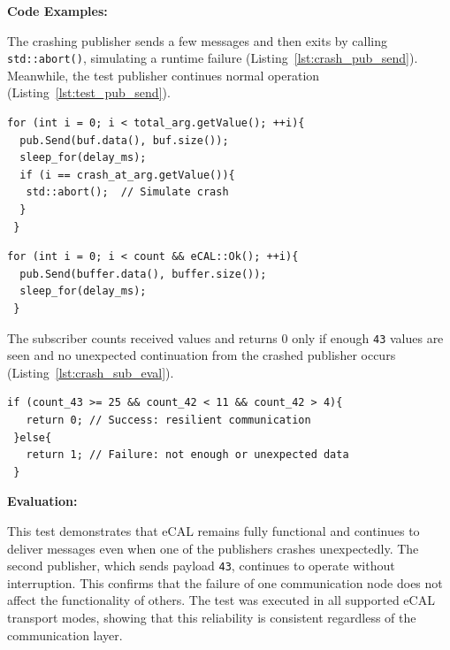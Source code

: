 \textbf{Code Examples:}

\vspace{0.4em}
The crashing publisher sends a few messages and then exits by calling \texttt{std::abort()}, simulating a runtime failure (Listing~\ref{lst:crash_pub_send}). Meanwhile, the test publisher continues normal operation (Listing~\ref{lst:test_pub_send}).

\vspace{0.5em}
\begin{lstlisting}[style=cppstyle, caption={Crash publisher sends and exits after 10 messages}, label={lst:crash_pub_send}, captionpos=b]
 for (int i = 0; i < total_arg.getValue(); ++i){
  pub.Send(buf.data(), buf.size());
  sleep_for(delay_ms);
  if (i == crash_at_arg.getValue()){
   std::abort();  // Simulate crash
  }
 }
\end{lstlisting}
\vspace{0.5em}
\begin{lstlisting}[style=cppstyle, caption={Resilient publisher continues sending messages}, label={lst:test_pub_send}, captionpos=b]
 for (int i = 0; i < count && eCAL::Ok(); ++i){
  pub.Send(buffer.data(), buffer.size());
  sleep_for(delay_ms);
 }
\end{lstlisting}

The subscriber counts received values and returns 0 only if enough \texttt{43} values are seen and no unexpected continuation from the crashed publisher occurs (Listing~\ref{lst:crash_sub_eval}).

\vspace{0.5em}
\begin{lstlisting}[style=cppstyle, caption={Subscriber decision logic}, label={lst:crash_sub_eval}, captionpos=b]
 if (count_43 >= 25 && count_42 < 11 && count_42 > 4){
   return 0; // Success: resilient communication
 }else{
   return 1; // Failure: not enough or unexpected data
 }
\end{lstlisting}

\vspace{0.5em}

\newpage
\textbf{Evaluation:}

This test demonstrates that eCAL remains fully functional and continues to deliver messages even when one of the publishers crashes unexpectedly. The second publisher, which sends payload \texttt{43}, continues to operate without interruption. This confirms that the failure of one communication node does not affect the functionality of others. The test was executed in all supported eCAL transport modes, showing that this reliability is consistent regardless of the communication layer.

